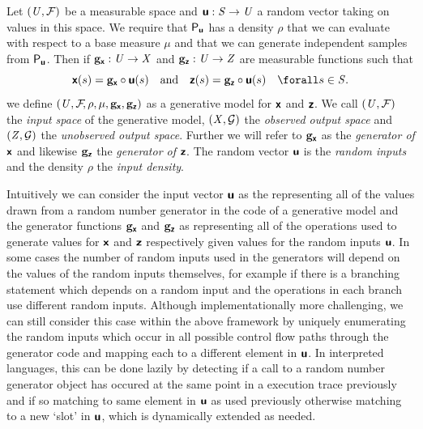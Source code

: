 \begin{definition}\label{def:generative-model}
Let $(\mathit{U},\mathcal{F})$ be a measurable space and $\boldsymbol{\mathsf{u}}: \mathit{S} \to \mathit{U}$ a random vector taking on values in this space. We require that $\mathsf{P}_{\boldsymbol{\mathsf{u}}}$ has a density $\rho$ that we can evaluate with respect to a base measure $\mu$ and that we can generate independent samples from $\mathsf{P}_{\boldsymbol{\mathsf{u}}}$. Then if ${\mathbf{g}}_{\boldsymbol{\mathsf{x}}} : \mathit{U} \to \mathit{X}$ and ${\mathbf{g}}_{\boldsymbol{\mathsf{z}}} : \mathit{U} \to \mathit{Z}$ are measurable functions such that
\begin{equation}
  \rvct{x}(s) = \genfunc_{\rvct{x}}\circ\rvct{u}(s)
  \quad\textrm{and}\quad
  \rvct{z}(s) = \genfunc_{\rvct{z}}\circ\rvct{u}(s)
  \quad \forall s \in \set{S}.
\end{equation}
we define $(\mathit{U},\mathcal{F}\kern-2pt,\rho,\mu,{\mathbf{g}}_{\boldsymbol{\mathsf{x}}},{\mathbf{g}}_{\boldsymbol{\mathsf{z}}})$ as a generative model for $\boldsymbol{\mathsf{x}}$ and $\boldsymbol{\mathsf{z}}$. We call $(\mathit{U},\mathcal{F})$ the \emph{input space} of the generative model, $(\mathit{X},\mathcal{G})$ the \emph{observed output space} and $(\mathit{Z},\mathcal{G})$ the \emph{unobserved output space}. Further we will refer to ${\mathbf{g}}_{\boldsymbol{\mathsf{x}}}$ as the \emph{generator of $\boldsymbol{\mathsf{x}}$} and likewise ${\mathbf{g}}_{\boldsymbol{\mathsf{z}}}$ the \emph{generator of $\boldsymbol{\mathsf{z}}$}. The random vector $\boldsymbol{\mathsf{u}}$ is the \emph{random inputs} and the density $\rho$ the \emph{input density}.
\end{definition}

Intuitively we can consider the input vector $\boldsymbol{\mathsf{u}}$ as the representing all of the values drawn from a random number generator in the code of a generative model and the generator functions ${\mathbf{g}}_{\boldsymbol{\mathsf{x}}}$ and ${\mathbf{g}}_{\boldsymbol{\mathsf{z}}}$ as representing all of the operations used to generate values for $\boldsymbol{\mathsf{x}}$ and $\boldsymbol{\mathsf{z}}$ respectively given values for the random inputs $\boldsymbol{\mathsf{u}}$. In some cases the number of random inputs used in the generators will depend on the values of the random inputs themselves, for example if there is a branching statement which depends on a random input and the operations in each branch use different random inputs. Although implementationally more challenging, we can still consider this case within the above framework by uniquely enumerating the random inputs which occur in all possible control flow paths through the generator code and mapping each to a different element in $\boldsymbol{\mathsf{u}}$. In interpreted languages, this can be done lazily by detecting if a call to a random number generator object has occured at the same point in a execution trace previously and if so matching to same element in $\boldsymbol{\mathsf{u}}$ as used previously otherwise matching to a new `slot' in $\boldsymbol{\mathsf{u}}$, which is dynamically extended as needed.

